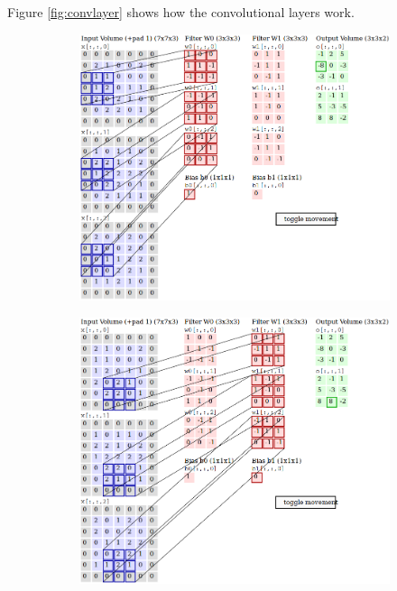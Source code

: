 \begin{description}
	Figure \ref{fig:convlayer} shows how the convolutional layers work. 
	
	\begin{figure}
		\centering
		\begin{subfigure}{0.625\textwidth}
			\centering
			\includegraphics[width=1\linewidth]{figures/convlayer_anime1big.png}
			\caption{}\label{fig:conv_a}
		\end{subfigure}
		\begin{subfigure}{0.625\textwidth}
			\centering
			\includegraphics[width=1\linewidth]{figures/convlayer_anime2big.png}

\end{subfigure}
\end{figure}
\end{description}
